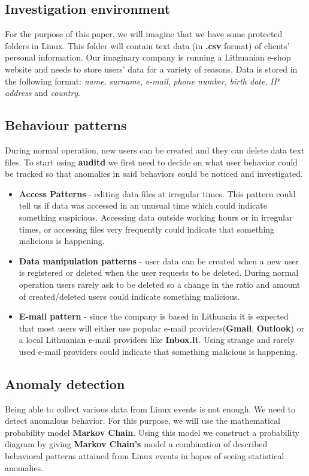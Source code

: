 \documentclass{VUMIFPSmagistrinis}
\begin{document}
    \subsection{Investigation environment}
        For the purpose of this paper, we will imagine that we have some protected folders in Linux.
        This folder will contain text data (in \textbf{.csv} format) of clients' personal information.
        Our imaginary company is running a Lithuanian e-shop website and needs to store users' data for a variety of reasons.
        Data is stored in the following format: \textit{name}, \textit{surname}, \textit{e-mail}, \textit{phone number}, \textit{birth date}, \textit{IP address} and \textit{country}.
    \subsection{Behaviour patterns}
        During normal operation, new users can be created and they can delete data text files.
        To start using \textbf{auditd} we first need to decide on what user behavior could be tracked so that anomalies in said behaviors could be noticed and investigated.

        \begin{itemize}
            \item \textbf{Access Patterns} - editing data files at irregular times. This pattern could tell us if data was accessed in an unusual time which could indicate something suspicious. Accessing data outside working hours or in irregular times, or accessing files very frequently could indicate that something malicious is happening.
            \item \textbf{Data manipulation patterns} - user data can be created when a new user is registered or deleted when the user requests to be deleted. 
            During normal operation users rarely ask to be deleted so a change in the ratio and amount of created/deleted users could indicate something malicious.
            \item \textbf{E-mail pattern} - since the company is based in Lithuania it is expected that most users will either use popular e-mail providers(\textbf{Gmail}, \textbf{Outlook}) or a local Lithuanian e-mail providers like \textbf{Inbox.lt}.
            Using strange and rarely used e-mail providers could indicate that something malicious is happening.
        \end{itemize}

    \subsection{Anomaly detection}
        Being able to collect various data from Linux events is not enough.
        We need to detect anomalous behavior. 
        For this purpose, we will use the mathematical probability model \textbf{Markov Chain}.
        Using this model we construct a probability diagram by giving \textbf{Markov Chain's} model a combination of described behavioral patterns attained from Linux events in hopes of seeing statistical anomalies.
\end{document}
